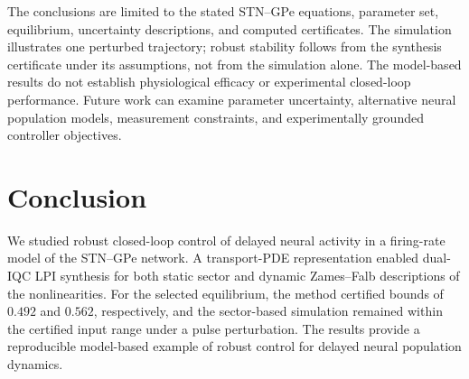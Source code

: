 \documentclass[9pt,twocolumn,twoside]{pnas-new}
\begin{document}
The conclusions are limited to the stated STN--GPe equations, parameter set, equilibrium, uncertainty descriptions, and computed certificates. The simulation illustrates one perturbed trajectory; robust stability follows from the synthesis certificate under its assumptions, not from the simulation alone. The model-based results do not establish physiological efficacy or experimental closed-loop performance. Future work can examine parameter uncertainty, alternative neural population models, measurement constraints, and experimentally grounded controller objectives.

\section{Conclusion}

We studied robust closed-loop control of delayed neural activity in a firing-rate model of the STN--GPe network. A transport-PDE representation enabled dual-IQC LPI synthesis for both static sector and dynamic Zames--Falb descriptions of the nonlinearities. For the selected equilibrium, the method certified bounds of $0.492$ and $0.562$, respectively, and the sector-based simulation remained within the certified input range under a pulse perturbation. The results provide a reproducible model-based example of robust control for delayed neural population dynamics.


\end{document}
